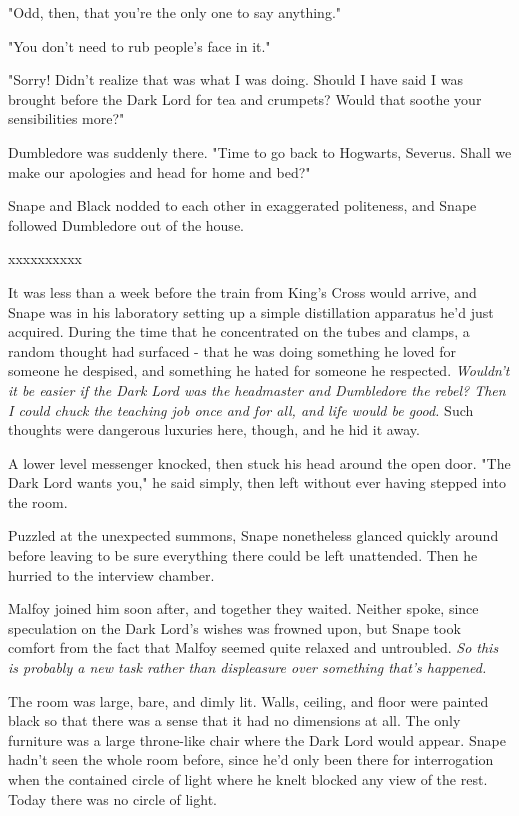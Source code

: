 \documentclass[a4paper,11pt]{article}
\begin{document}
"Odd, then, that you're the only one to say anything."

"You don't need to rub people's face in it."

"Sorry! Didn't realize that was what I was doing. Should I have said I was brought before the Dark Lord for tea and crumpets? Would that soothe your sensibilities more?"

Dumbledore was suddenly there. "Time to go back to Hogwarts, Severus. Shall we make our apologies and head for home and bed?"

Snape and Black nodded to each other in exaggerated politeness, and Snape followed Dumbledore out of the house.

xxxxxxxxxx

It was less than a week before the train from King's Cross would arrive, and Snape was in his laboratory setting up a simple distillation apparatus he'd just acquired. During the time that he concentrated on the tubes and clamps, a random thought had surfaced - that he was doing something he loved for someone he despised, and something he hated for someone he respected. \emph{Wouldn't it be easier if the Dark Lord was the headmaster and Dumbledore the rebel? Then I could chuck the teaching job once and for all, and life would be good.} Such thoughts were dangerous luxuries here, though, and he hid it away.

A lower level messenger knocked, then stuck his head around the open door. "The Dark Lord wants you," he said simply, then left without ever having stepped into the room.

Puzzled at the unexpected summons, Snape nonetheless glanced quickly around before leaving to be sure everything there could be left unattended. Then he hurried to the interview chamber.

Malfoy joined him soon after, and together they waited. Neither spoke, since speculation on the Dark Lord's wishes was frowned upon, but Snape took comfort from the fact that Malfoy seemed quite relaxed and untroubled. \emph{So this is probably a new task rather than displeasure over something that's happened.}

The room was large, bare, and dimly lit. Walls, ceiling, and floor were painted black so that there was a sense that it had no dimensions at all. The only furniture was a large throne-like chair where the Dark Lord would appear. Snape hadn't seen the whole room before, since he'd only been there for interrogation when the contained circle of light where he knelt blocked any view of the rest. Today there was no circle of light.
\end{document}
